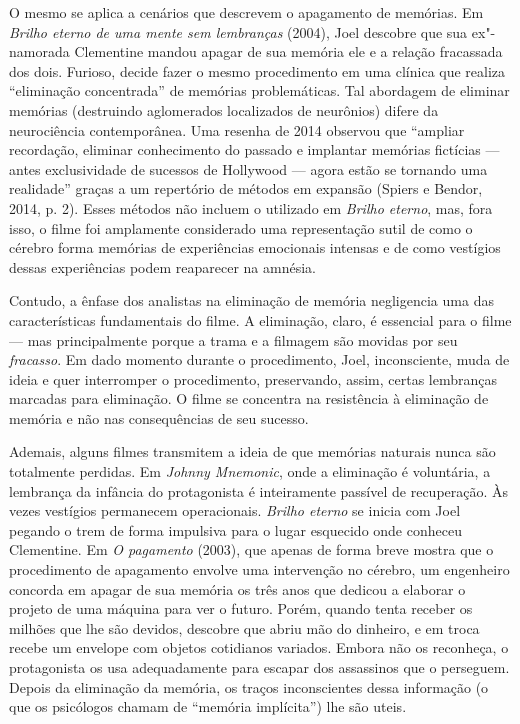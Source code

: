 O mesmo se aplica a cenários que descrevem o apagamento de memórias. Em
\emph{Brilho eterno de uma mente sem lembranças} (2004), Joel descobre
que sua ex"-namorada Clementine mandou apagar de sua memória ele e a
relação fracassada dos dois. Furioso, decide fazer o mesmo procedimento
em uma clínica que realiza ``eliminação concentrada'' de memórias
problemáticas. Tal abordagem de eliminar memórias (destruindo
aglomerados localizados de neurônios) difere da neurociência
contemporânea. Uma resenha de 2014 observou que ``ampliar recordação,
eliminar conhecimento do passado e implantar memórias fictícias ---
antes exclusividade de sucessos de Hollywood --- agora estão se tornando
uma realidade'' graças a um repertório de métodos em expansão (Spiers e
Bendor, 2014, p. 2). Esses métodos não incluem o utilizado em
\emph{Brilho eterno}, mas, fora isso, o filme foi amplamente considerado
uma representação sutil de como o cérebro forma memórias de experiências
emocionais intensas e de como vestígios dessas experiências podem
reaparecer na amnésia.

Contudo, a ênfase dos analistas na eliminação de memória negligencia uma
das características fundamentais do filme. A eliminação, claro, é
essencial para o filme --- mas principalmente porque a trama e a
filmagem são movidas por seu \emph{fracasso}. Em dado momento durante o
procedimento, Joel, inconsciente, muda de ideia e quer interromper o
procedimento, preservando, assim, certas lembranças marcadas para
eliminação. O filme se concentra na resistência à eliminação de memória
e não nas consequências de seu sucesso.

Ademais, alguns filmes transmitem a ideia de que memórias naturais nunca
são totalmente perdidas. Em \emph{Johnny Mnemonic}, onde a eliminação é
voluntária, a lembrança da infância do protagonista é inteiramente
passível de recuperação. Às vezes vestígios permanecem operacionais.
\emph{Brilho eterno} se inicia com Joel pegando o trem de forma
impulsiva para o lugar esquecido onde conheceu Clementine. Em \emph{O
pagamento} (2003), que apenas de forma breve mostra que o procedimento
de apagamento envolve uma intervenção no cérebro, um engenheiro concorda
em apagar de sua memória os três anos que dedicou a elaborar o projeto
de uma máquina para ver o futuro. Porém, quando tenta receber os milhões
que lhe são devidos, descobre que abriu mão do dinheiro, e em troca
recebe um envelope com objetos cotidianos variados. Embora não os
reconheça, o protagonista os usa adequadamente para escapar dos
assassinos que o perseguem. Depois da eliminação da memória, os traços
inconscientes dessa informação (o que os psicólogos chamam de ``memória
implícita'') lhe são uteis.

